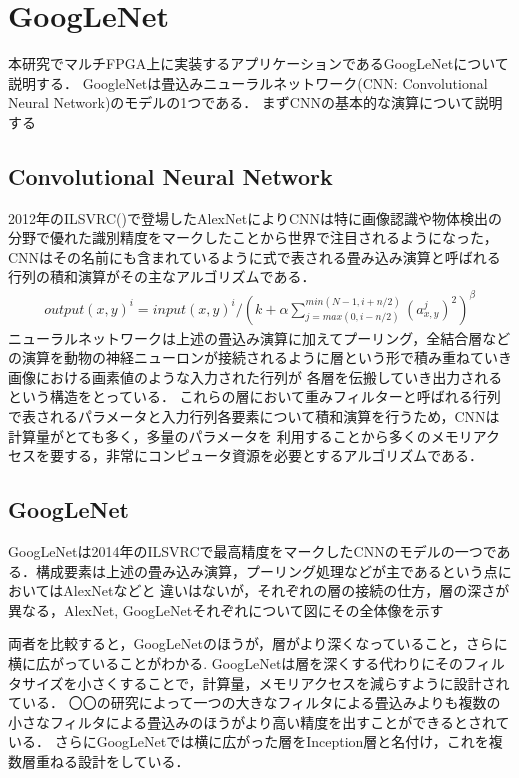 \chapter{GoogLeNet}
{
\label{chap:googlenet}
本研究でマルチFPGA上に実装するアプリケーションであるGoogLeNetについて説明する．
GoogleNetは畳込みニューラルネットワーク(CNN: Convolutional Neural Network)のモデルの1つである．
まずCNNの基本的な演算について説明する
\section{Convolutional Neural Network}
\label{sec:cnn}
2012年のILSVRC()で登場したAlexNetによりCNNは特に画像認識や物体検出の分野で優れた識別精度をマークしたことから世界で注目されるようになった，
CNNはその名前にも含まれているように式で表される畳み込み演算と呼ばれる行列の積和演算がその主なアルゴリズムである．
\begin{eqnarray}
	output(x, y)^{i} = input(x, y)^{i} / (k + \alpha \sum_{j=max(0, i-n/2)}^{min(N-1, i+n/2)} (a^j_{x, y})^2)^\beta
\end{eqnarray}
ニューラルネットワークは上述の畳込み演算に加えてプーリング，全結合層などの演算を動物の神経ニューロンが接続されるように層という形で積み重ねていき画像における画素値のような入力された行列が
各層を伝搬していき出力されるという構造をとっている．
これらの層において重みフィルターと呼ばれる行列で表されるパラメータと入力行列各要素について積和演算を行うため，CNNは計算量がとても多く，多量のパラメータを
利用することから多くのメモリアクセスを要する，非常にコンピュータ資源を必要とするアルゴリズムである．

\section{GoogLeNet}
\label{sec:googlenet}
GoogLeNetは2014年のILSVRCで最高精度をマークしたCNNのモデルの一つである．構成要素は上述の畳み込み演算，プーリング処理などが主であるという点においてはAlexNetなどと
違いはないが，それぞれの層の接続の仕方，層の深さが異なる，AlexNet, GoogLeNetそれぞれについて図にその全体像を示す

両者を比較すると，GoogLeNetのほうが，層がより深くなっていること，さらに横に広がっていることがわかる.
GoogLeNetは層を深くする代わりにそのフィルタサイズを小さくすることで，計算量，メモリアクセスを減らすように設計されている．
〇〇の研究によって一つの大きなフィルタによる畳込みよりも複数の小さなフィルタによる畳込みのほうがより高い精度を出すことができるとされている．
さらにGoogLeNetでは横に広がった層をInception層と名付け，これを複数層重ねる設計をしている．

}
